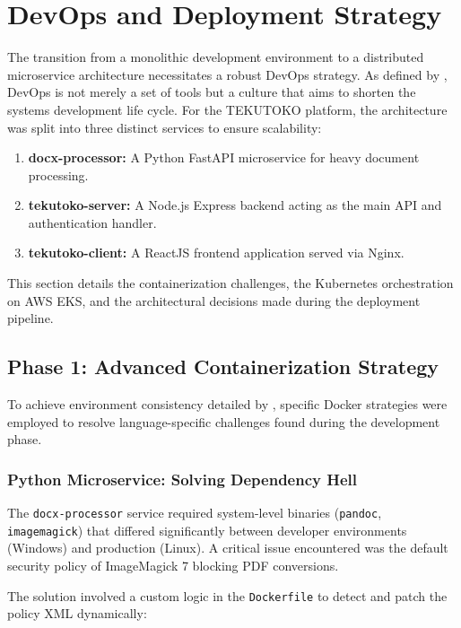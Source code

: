 \section{DevOps and Deployment Strategy}
\label{sec:devops-strategy}

The transition from a monolithic development environment to a distributed microservice architecture necessitates a robust DevOps strategy. As defined by \citet{kim2016}, DevOps is not merely a set of tools but a culture that aims to shorten the systems development life cycle. For the TEKUTOKO platform, the architecture was split into three distinct services to ensure scalability:
\begin{enumerate}
    \item \textbf{docx-processor:} A Python FastAPI microservice for heavy document processing.
    \item \textbf{tekutoko-server:} A Node.js Express backend acting as the main API and authentication handler.
    \item \textbf{tekutoko-client:} A ReactJS frontend application served via Nginx.
\end{enumerate}

This section details the containerization challenges, the Kubernetes orchestration on AWS EKS, and the architectural decisions made during the deployment pipeline.

\subsection{Phase 1: Advanced Containerization Strategy}
\label{subsec:containerization}

To achieve environment consistency detailed by \citet{merkel2014}, specific Docker strategies were employed to resolve language-specific challenges found during the development phase.

\subsubsection{Python Microservice: Solving Dependency Hell}
The \texttt{docx-processor} service required system-level binaries (\texttt{pandoc}, \texttt{imagemagick}) that differed significantly between developer environments (Windows) and production (Linux). A critical issue encountered was the default security policy of ImageMagick 7 blocking PDF conversions.

The solution involved a custom logic in the \texttt{Dockerfile} to detect and patch the policy XML dynamically:

